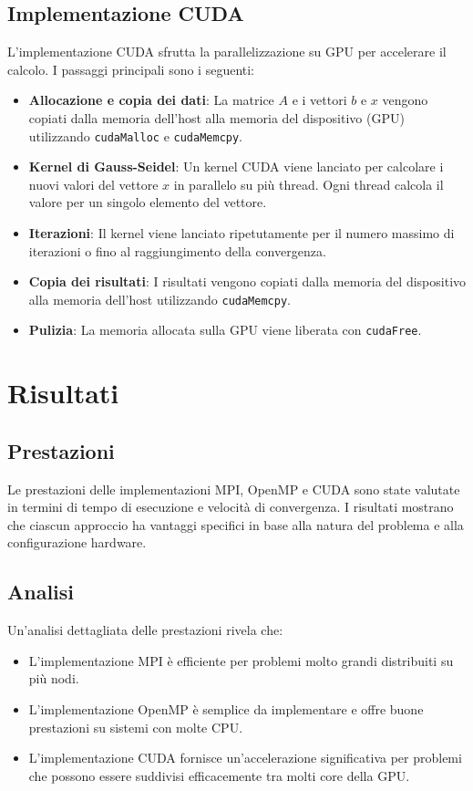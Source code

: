 \documentclass[a4paper,12pt]{article}
\begin{document}
\subsection{Implementazione CUDA}
L'implementazione CUDA sfrutta la parallelizzazione su GPU per accelerare il calcolo. I passaggi principali sono i seguenti:

\begin{itemize}
    \item \textbf{Allocazione e copia dei dati}: La matrice \( A \) e i vettori \( b \) e \( x \) vengono copiati dalla memoria dell'host alla memoria del dispositivo (GPU) utilizzando \texttt{cudaMalloc} e \texttt{cudaMemcpy}.
    \item \textbf{Kernel di Gauss-Seidel}: Un kernel CUDA viene lanciato per calcolare i nuovi valori del vettore \( x \) in parallelo su più thread. Ogni thread calcola il valore per un singolo elemento del vettore.
    \item \textbf{Iterazioni}: Il kernel viene lanciato ripetutamente per il numero massimo di iterazioni o fino al raggiungimento della convergenza.
    \item \textbf{Copia dei risultati}: I risultati vengono copiati dalla memoria del dispositivo alla memoria dell'host utilizzando \texttt{cudaMemcpy}.
    \item \textbf{Pulizia}: La memoria allocata sulla GPU viene liberata con \texttt{cudaFree}.
\end{itemize}

\section{Risultati}
\subsection{Prestazioni}
Le prestazioni delle implementazioni MPI, OpenMP e CUDA sono state valutate in termini di tempo di esecuzione e velocità di convergenza. I risultati mostrano che ciascun approccio ha vantaggi specifici in base alla natura del problema e alla configurazione hardware.

\subsection{Analisi}
Un'analisi dettagliata delle prestazioni rivela che:
\begin{itemize}
    \item L'implementazione MPI è efficiente per problemi molto grandi distribuiti su più nodi.
    \item L'implementazione OpenMP è semplice da implementare e offre buone prestazioni su sistemi con molte CPU.
    \item L'implementazione CUDA fornisce un'accelerazione significativa per problemi che possono essere suddivisi efficacemente tra molti core della GPU.
\end{itemize}
\end{document}
